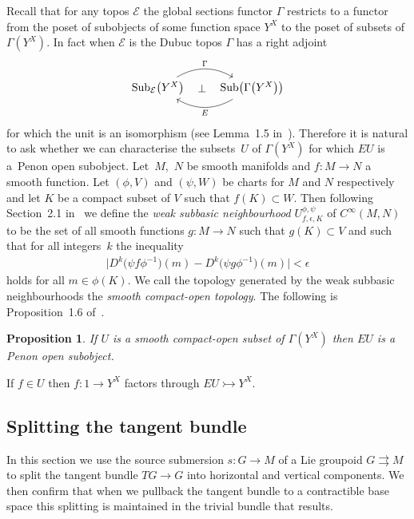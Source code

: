 \documentclass[pdftex]{sigma}
\numberwithin{equation}{section}
\newtheorem{Proposition}[Theorem]{Proposition}
{ \theoremstyle{definition}
\newtheorem{Definition}[Theorem]{Definition}
\newtheorem{Notation}[Theorem]{Notation}
\newtheorem{Example}[Theorem]{Example}
\newtheorem{Remark}[Theorem]{Remark} }
\begin{document}
Recall that for any topos $ \mathcal{E}$ the global sections functor $\Gamma$ restricts to a functor from the poset of subobjects of some function space $Y^X$ to the poset of subsets of $\Gamma(Y^X)$. In fact when $\mathcal{E}$ is the Dubuc topos $\Gamma$ has a right adjoint
\begin{equation*}
\begin{tikzcd}
 {\rm Sub}_{\mathcal{E}}\big(Y^X\big) \rar[bend left]{\Gamma} \rar[phantom]{\perp} & {\rm Sub}\big(\Gamma\big(Y^X\big)\big) \lar[bend left]{E}
\end{tikzcd}
\end{equation*}
for which the unit is an isomorphism (see Lemma~1.5 in~\cite{MR796353}). Therefore it is natural to ask whether we can characterise the subsets~$U$ of $\Gamma(Y^X)$ for which $EU$ is a~Penon open subobject. Let~$M$,~$N$ be smooth manifolds and $ f \colon M \rightarrow N $ a smooth function. Let $ ( \phi , V ) $ and $ ( \psi , W ) $ be charts for $ M $ and $ N $ respectively and let $ K $ be a compact subset of $ V $ such that $ f ( K ) \subset W $. Then following Section~2.1 in~\cite{MR0448362} we def\/ine the \emph{weak subbasic neighbourhood} $ U_{f , \epsilon, K } ^{ \phi , \psi} $ of $ C^{ \infty } ( M , N ) $ to be the set of all smooth functions $ g \colon M \rightarrow N $ such that $ g ( K ) \subset V $ and such that for all integers~$ k $ the inequality
\begin{gather*}\big|D^k\big(\psi f \phi^{-1}\big) (m) - D^k \big( \psi g \phi^{-1} \big) (m)\big| < \epsilon\end{gather*}
holds for all $m\in\phi(K)$. We call the topology generated by the weak subbasic neighbourhoods the \emph{smooth compact-open topology}. The following is Proposition~1.6 of~\cite{MR796353}.
\begin{Proposition}\label{prop:compact-open-implies-penon}
If $U$ is a smooth compact-open subset of $\Gamma(Y^X)$ then $EU$ is a Penon open subobject.
\end{Proposition}
\begin{Remark}If $f\in U$ then $f\colon 1 \rightarrow Y^X$ factors through $EU \rightarrowtail Y^X$.
\end{Remark}

\subsection{Splitting the tangent bundle}

In this section we use the source submersion $s\colon G\rightarrow M$ of a Lie groupoid $G \rightrightarrows M $ to split the tangent bundle $TG\rightarrow G$ into horizontal and vertical components. We then conf\/irm that when we pullback the tangent bundle to a contractible base space this splitting is maintained in the trivial bundle that results.
\end{document}
